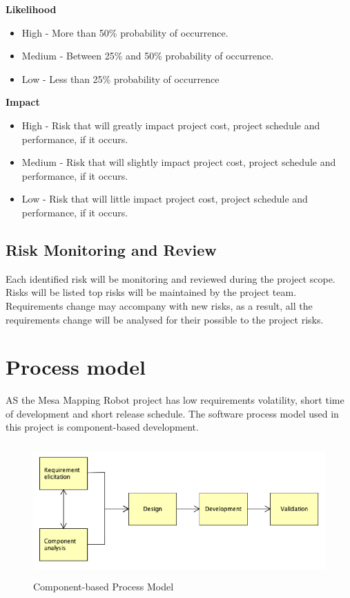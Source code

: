 \documentclass[11pt, a4paper]{article}
\begin{document}
\textbf{Likelihood}
\begin{itemize}
\item { High - }More than 50\% probability of occurrence.
\item { Medium - }Between 25\% and 50\% probability of occurrence.
\item { Low - }Less than 25\% probability of occurrence
\end{itemize}

\textbf{Impact}
\begin{itemize}
\item { High - }Risk that will greatly impact project cost, project schedule and performance, if it occurs.
\item { Medium - }Risk that will slightly impact project cost, project schedule and performance, if it occurs.
\item { Low - }Risk that will little impact project cost, project schedule and performance, if it occurs.
\end{itemize}

\subsection{Risk Monitoring and Review}
Each identified risk will be monitoring and reviewed during the project scope. Risks will be listed top risks will be maintained by the project team. Requirements change may accompany with new risks, as a result, all the requirements change will be analysed for their possible to the project risks.
\newpage

\section{Process model}
AS the Mesa Mapping Robot project has low requirements volatility, short time of development and short release schedule. The software process model used in this project is component-based development.

\begin{figure}[H]
\centering
\includegraphics[height=2in]{PM.png}
\caption[Component-based Process Model]{Component-based Process Model}
\end{figure}
\end{document}
